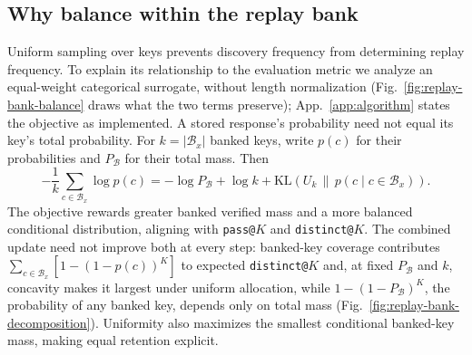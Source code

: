 \documentclass{article}
\newcommand{\1}{\mathbf 1}
\theoremstyle{remark}
\theoremstyle{definition}
\theoremstyle{plain}
\begin{document}
\subsection{Why balance within the replay bank}
\label{app:replay-metric-alignment}

Uniform sampling over keys prevents discovery frequency from determining replay
frequency. To explain its relationship to the evaluation metric we analyze an
equal-weight categorical surrogate, without length normalization
(Fig.~\ref{fig:replay-bank-balance} draws what the two terms preserve);
App.~\ref{app:algorithm} states the objective as implemented.
A stored response's probability need not equal its key's total probability.
For $k=|\mathcal B_x|$ banked keys, write $p(c)$ for their probabilities and
$P_{\mathcal B}$ for their total mass. Then
\begin{equation}
 -\frac1k\sum_{c\in\mathcal B_x}\log p(c)
 =-\log P_{\mathcal B}+\log k+
   \mathrm{KL}\!\left(U_k\,\|\,
   p(c\mid c\in\mathcal B_x)\right).
 \label{eq:replay-bank-decomposition}
\end{equation}
The objective rewards greater banked verified mass and a more balanced
conditional distribution, aligning with \texttt{pass@}$K$ and
\texttt{distinct@}$K$. The combined update need not improve both at every step:
banked-key coverage contributes $\sum_{c\in\mathcal B_x}[1-(1-p(c))^K]$ to
expected \texttt{distinct@}$K$ and, at fixed $P_{\mathcal B}$ and $k$, concavity
makes it largest under uniform allocation, while $1-(1-P_{\mathcal B})^K$, the
probability of any banked key, depends only on total mass
(Fig.~\ref{fig:replay-bank-decomposition}). Uniformity also
maximizes the smallest conditional banked-key mass, making equal retention
explicit.
\end{document}
